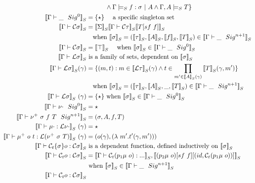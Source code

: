 \begin{align*}
      & \quad \quad \quad \land  {\goodSealS{\Gamma}{f}{\sigma}{A}}
      \land  {\goodTypeS{\Gamma, A}{T}{i}} 
  \} \\ 
  \denotesS{\goodSig{\Gamma}{\_}{0}} &= \{\star\} \quad \text{ a specific singleton set} \\
  \denotesS{\goodType{\Gamma}{\cC \sigma}{}} &= \denotesS{\Sigma} \denotesS{\goodType{\Gamma}{\cC \tau}{}} \denotesS{T[sf \ f]} \\
  & \quad \text{when } \denotesS{\sigma} = (\denotesS{\tau}, \denotesS{A}, \denotesS{f} , \denotesS{T}) \in \denotesS{\goodSig{\Gamma}{\_}{n+1}} \\
  \denotesS{\goodType{\Gamma}{\cC \sigma}{i}}&= \denotesS{\top}\quad \text{ when } \denotesS{\sigma} \in \denotesS{\goodSig{\Gamma}{\_}{0}} \\
  \denotesS{\goodType{\Gamma}{\cL \sigma}{i}} & \text{ is a family of sets, dependent on } \denotesS{\sigma}  \\
  \denotesS{\goodType{\Gamma}{\cL \sigma}{i}} (\gamma)&= \{(m, t) :  m \in \denotesS{\cL \tau}(\gamma) \land t \in \prod_{m' \in \denotesS{A}(\gamma)}\denotesS{T}(\gamma, m')  \}  \\
  & \quad \text{when } \denotesS{\sigma} = (\denotesS{\tau}, \denotesS{A}, \_, \denotesS{T}) \in \denotesS{\goodSig{\Gamma}{\_}{n+1}} \\
  \denotesS{\goodType{\Gamma}{\cL \sigma}{i}} \ (\gamma)&= \{\star\} \text{ when } \denotesS{\sigma} \in \denotesS{\goodSig{\Gamma}{\_}{0}} \\
  \denotesS{\goodSig{\Gamma}{\nu\cdot}{0}} &= \star \\
  \denotesS{\goodSig{\Gamma}{\nu^+ \ \sigma \ f \ T}{n+1}} &= (\sigma, A, f, T) \\
  \denotesS{\goodTerm{\Gamma}{\mu\cdot}{\cL \nu\cdot} } \ (\gamma) &= \star \\
  \denotesS{\goodTerm{\Gamma}{\mu^+ \ o \ t}{\cL(\nu^+ \ \sigma  \ T)}} \ (\gamma)&= (o(\gamma), (\lambda \ m' . t'(\gamma, m'))) \\
  \denotesS{\goodTerm{\Gamma}{\cCt \{\sigma\} o}{\cC\sigma}} & \text{ is a dependent function, defined inductively on } \denotesS{\sigma} \\
  \denotesS{\goodTerm{\Gamma}{\cCt o}{\cC\sigma}}
  &= \denotesS{\goodTerm{\Gamma}{\cCt (p_1\mu \ o)}{...}}, \denotesS{(p_2\mu \ o)[sf \ f][(id, \cCt (p_1\mu \ o))]} \\
  & \text{ when } \denotesS{\sigma} \in \denotesS{\goodSig{\Gamma}{\_}{n+1}} \\
  \denotesS{\goodTerm{\Gamma}{\cCt o}{\cC\sigma}}

\end{align*}
